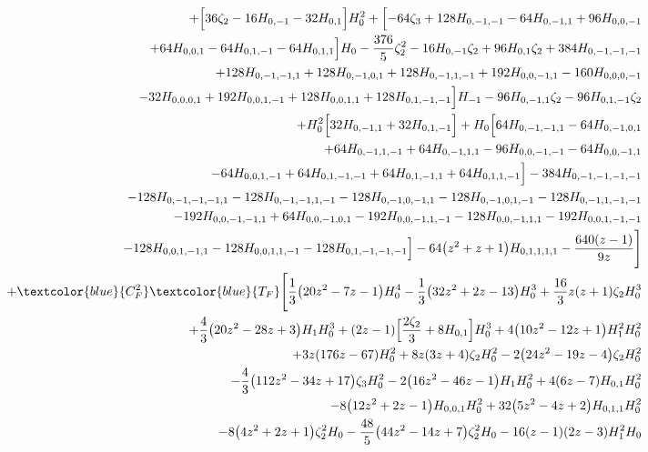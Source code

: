 \begin{eqnarray}
\nonumber \\ &&
+\Bigl[36 \zeta_2-16 H_{0,-1}-32  H_{0,1}\Bigr] H_0^2+\Bigl[-64 \zeta_3+128 H_{0,-1,-1}
-64H_{0,-1,1}+96 H_{0,0,-1}
\nonumber \\ &&
+64 H_{0,0,1}-64 H_{0,1,-1}
-64 H_{0,1,1}\Bigr] H_0-\frac{376}{5}\zeta_2^2-16 H_{0,-1} \zeta_2
+96 H_{0,1} \zeta_2+384 H_{0,-1,-1,-1}
\nonumber \\ &&
+128H_{0,-1,-1,1}+128  H_{0,-1,0,1}
+128H_{0,-1,1,-1}+192  H_{0,0,-1,1}-160H_{0,0,0,-1}
\nonumber \\ &&
-32 H_{0,0,0,1}+192  H_{0,0,1,-1}+128 H_{0,0,1,1}
+128 H_{0,1,-1,-1}
\Bigr] H_{-1}
-96H_{0,-1,1} \zeta_2-96 H_{0,1,-1} \zeta_2
\nonumber \\ &&
+H_0^2\Bigl[32  H_{0,-1,1}
+32  H_{0,1,-1}\Bigr]+H_0 \Bigl[64 H_{0,-1,-1,1}-64 H_{0,-1,0,1}
\nonumber \\ &&
+64H_{0,-1,1,-1}
+64 H_{0,-1,1,1}-96 H_{0,0,-1,-1}-64H_{0,0,-1,1}
\nonumber \\ &&
-64 H_{0,0,1,-1}
+64 H_{0,1,-1,-1}
+64 H_{0,1,-1,1}
+64H_{0,1,1,-1}\Bigr]
-384 H_{0,-1,-1,-1,-1}
\nonumber \\ &&
-128H_{0,-1,-1,-1,1}
-128 H_{0,-1,-1,1,-1}
-128  H_{0,-1,0,-1,1}
-128 H_{0,-1,0,1,-1}-128 H_{0,-1,1,-1,-1}
\nonumber \\ &&
-192 H_{0,0,-1,-1,1}
+64  H_{0,0,-1,0,1}-192  H_{0,0,-1,1,-1}-128 H_{0,0,-1,1,1}
-192  H_{0,0,1,-1,-1}
\nonumber \\ &&
-128  H_{0,0,1,-1,1}
-128 H_{0,0,1,1,-1}-128 H_{0,1,-1,-1,-1}
\Bigr]
-64 \big(z^2+z+1\big) H_{0,1,1,1,1}
-\frac{640   (z-1)}{9 z}\Biggr]
\nonumber \\ &&
%
+\textcolor{blue}{C_F^2}  \textcolor{blue}{T_F}
\Biggl[\frac{1}{3} \big(20 z^2-7 z-1\big)H_0^4
-\frac{1}{3} \big(32 z^2+2 z-13\big) H_0^3
+\frac{16}{3}  z (z+1)\zeta_2 H_0^3
\nonumber \\ &&
+\frac{4}{3} \big(20 z^2-28 z+3\big) H_1 H_0^3
+(2 z-1)\Bigl[\frac{2 \zeta_2}{3}+8 H_{0,1}\Bigr] H_0^3
+4 \big(10 z^2-12 z+1\big)H_1^2 H_0^2
\nonumber \\ &&
+3 z (176 z-67) H_0^2
+8  z (3 z+4) \zeta_2 H_0^2
-2\big(24 z^2-19 z-4\big) \zeta_2 H_0^2
\nonumber \\ &&
-\frac{4}{3} \big(112 z^2-34z+17\big) \zeta_3 H_0^2
-2 \big(16 z^2-46 z-1\big) H_1 H_0^2
+4 (6 z-7)H_{0,1} H_0^2
\nonumber \\ &&
-8 \big(12 z^2+2 z-1\big) H_{0,0,1} H_0^2+32 \big(5 z^2-4z+2\big) H_{0,1,1} H_0^2
\nonumber \\ &&
-8  \big(4 z^2+2 z+1\big) \zeta_2^2H_0-\frac{48}{5} \big(44 z^2-14 z+7\big) \zeta_2^2 H_0-16 (z-1) (2 z-3)H_1^2 H_0

\end{eqnarray}
